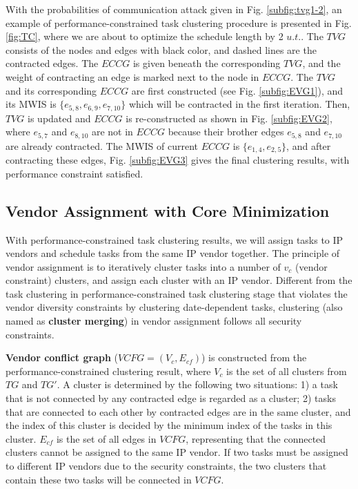 \documentclass[10pt,journal]{IEEEtran}
\begin{document}
With the probabilities of communication attack given in Fig. \ref{subfig:tvg1-2}, an example of performance-constrained task clustering procedure is presented in Fig. \ref{fig:TC}, where we are about to optimize the schedule length by 2 $u.t.$. The $TVG$ consists of the nodes and edges with black color, and dashed lines are the contracted edges. The $ECCG$ is given beneath the corresponding $TVG$, and the weight of contracting an edge is marked next to the node in $ECCG$. The $TVG$ and its corresponding $ECCG$ are first constructed (see Fig. \ref{subfig:EVG1}), and its MWIS is $\{e_{5,8}, e_{6,9}, e_{7,10}\}$ which will be contracted in the first iteration. Then, $TVG$ is updated and $ECCG$ is re-constructed as shown in Fig. \ref{subfig:EVG2}, where $e_{5,7}$ and $e_{8,10}$ are not in $ECCG$ because their brother edges $e_{5,8}$ and $e_{7,10}$ are already contracted. The MWIS of current $ECCG$ is $\{e_{1,4}, e_{2,5}\}$, and after contracting these edges, Fig. \ref{subfig:EVG3} gives the final clustering results, with performance constraint satisfied.%



\subsection{Vendor Assignment with Core Minimization}

With performance-constrained task clustering results, we will assign tasks to IP vendors and schedule tasks from the same IP vendor together. The principle of vendor assignment is to iteratively cluster tasks into a number of $v_c$ (vendor constraint) clusters, and assign each cluster with an IP vendor. Different from the task clustering in performance-constrained task clustering stage that violates the vendor diversity constraints by clustering date-dependent tasks, clustering (also named as \textbf{cluster merging}) in vendor assignment follows all security constraints.%

\textbf{Vendor conflict graph} ($VCFG=(V_c, E_{cf})$) is constructed from the performance-constrained clustering result, where $V_c$ is the set of all clusters from $TG$ and $TG'$. A cluster is determined by the following two situations: 1) a task that is not connected by any contracted edge is regarded as a cluster; 2) tasks that are connected to each other by contracted edges are in the same cluster, and the index of this cluster is decided by the minimum index of the tasks in this cluster. $E_{cf}$ is the set of all edges in $VCFG$, representing that the connected clusters cannot be assigned to the same IP vendor. If two tasks must be assigned to different IP vendors due to the security constraints, the two clusters that contain these two tasks will be connected in $VCFG$.
\end{document}
